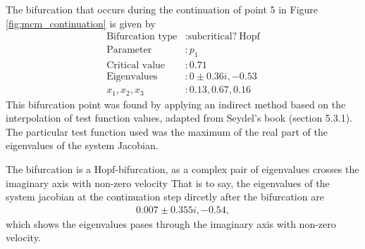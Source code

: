 The bifurcation that occurs during the continuation of point 5 in Figure \ref{fig:mcm_continuation} is given by
\begin{align*}
    \text{Bifurcation type} & : \text{subcritical?} \ \text{Hopf} \\
    \text{Parameter} & : p_1 \\
    \text{Critical value} & : 0.71 \\
    \text{Eigenvalues} & : 0 \pm 0.36i, -0.53\\
    x_1, x_2, x_3 & : 0.13, 0.67, 0.16
\end{align*}
This bifurcation point was found by applying an indirect method based on the interpolation of test function values, adapted from 
Seydel's book (section 5.3.1). The particular test function used was the maximum of the real part of the eigenvalues of
the system Jacobian.

The bifurcation is a Hopf-bifurcation, as a complex pair of eigenvalues crosses the imaginary axis with non-zero velocity
That is to say, the eigenvalues of the system jacobian at the continuation step dircetly after the bifurcation are
\begin{align*}
    0.007 \pm 0.355i, -0.54,
\end{align*}
which shows the eigenvalues pases through the imaginary axis with non-zero velocity.

